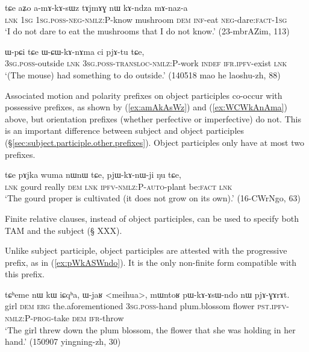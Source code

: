\begin{exe}
\ex  \label{ex:amAkAsWz}
\gll tɕe aʑo a-mɤ-kɤ-sɯz tɤjmɤɣ nɯ kɤ-ndza mɤ-naz-a \\
\textsc{lnk} \textsc{1sg} \textsc{1sg}.\textsc{poss}-\textsc{neg}-\textsc{nmlz}:P-know mushroom \textsc{dem} \textsc{inf}-eat \textsc{neg}-dare:\textsc{fact}-\textsc{1sg}  \\
\glt `I do not dare to eat the mushrooms that I do not know.' (23-mbrAZim, 113)
\end{exe}

\begin{exe}
\ex  \label{ex:WCWkAnAma}
\gll ɯ-pɕi tɕe ɯ-ɕɯ-kɤ-nɤma ci pjɤ-tu tɕe, \\
\textsc{3sg}.\textsc{poss}-outside \textsc{lnk} \textsc{3sg}.\textsc{poss}-\textsc{transloc}-\textsc{nmlz}:P-work \textsc{indef} \textsc{ifr}.\textsc{ipfv}-exist \textsc{lnk} \\
\glt  `(The mouse) had something to do outside.' (140518 mao he laoshu-zh, 88)
\end{exe}

Associated motion and polarity prefixes on object participles co-occur with possessive prefixes, as shown by  (\ref{ex:amAkAsWz}) and  (\ref{ex:WCWkAnAma})  above, but orientation prefixes (whether perfective or imperfective) do not. This is an important difference between subject and object participles (§\ref{sec:subject.participle.other.prefixes}). Object participles only have at most two prefixes.

\begin{exe}
\ex  \label{ex:pjWKAnWji}
\gll tɕe pɤjka wuma nɯnɯ tɕe, pjɯ-kɤ-nɯ-ji ŋu tɕe, \\
\textsc{lnk} gourd really \textsc{dem} \textsc{lnk} \textsc{ipfv}-\textsc{nmlz}:P-\textsc{auto}-plant be:\textsc{fact} \textsc{lnk} \\
\glt `The gourd proper is cultivated (it does not grow on its own).' (16-CWrNgo, 63)
\end{exe}

Finite relative clauses, instead of object participles, can be used to specify both TAM and the subject (§ XXX).

Unlike subject participle, object participles are attested with the progressive  prefix, as in (\ref{ex:pWkASWndo}). It is the only non-finite form compatible with this prefix.  

\begin{exe}
\ex  \label{ex:pWkASWndo}
\gll  tɕʰeme nɯ kɯ iɕqʰa, ɯ-jaʁ <meihua>, mɯntoʁ pɯ-kɤ-ɤsɯ-ndo nɯ pjɤ-ɣɤrɤt.  \\
girl \textsc{dem} \textsc{erg} the.aforementioned \textsc{3sg}.\textsc{poss}-hand plum.blossom flower \textsc{pst}.\textsc{ipfv}-\textsc{nmlz}:P-\textsc{prog}-take \textsc{dem} \textsc{ifr}-throw \\
\glt `The girl threw down the plum blossom, the flower that she was holding in her hand.' (150907 yingning-zh, 30)
\end{exe}

